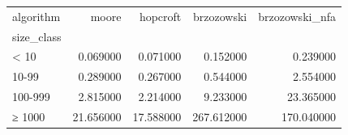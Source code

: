 \begin{tabular}{lrrrr}
\toprule
algorithm & moore & hopcroft & brzozowski & brzozowski_nfa \\
size_class &  &  &  &  \\
\midrule
< 10 & 0.069000 & 0.071000 & 0.152000 & 0.239000 \\
10-99 & 0.289000 & 0.267000 & 0.544000 & 2.554000 \\
100-999 & 2.815000 & 2.214000 & 9.233000 & 23.365000 \\
≥ 1000 & 21.656000 & 17.588000 & 267.612000 & 170.040000 \\
\bottomrule
\end{tabular}
